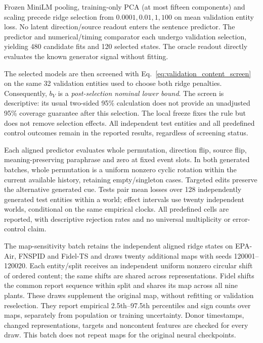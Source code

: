 Frozen MiniLM pooling, training-only PCA (at most fifteen components) and scaling precede ridge selection from $0.0001,0.01,1,100$ on mean validation entity loss. No latent direction/source readout enters the sentence predictor. The predictor and numerical/timing comparator each undergo validation selection, yielding 480 candidate fits and 120 selected states. The oracle readout directly evaluates the known generator signal without fitting.

The selected models are then screened with Eq.~\ref{eq:validation_content_screen} on the same 32 validation entities used to choose both ridge penalties. Consequently, $b_V$ is a \emph{post-selection nominal lower bound}. The screen is descriptive: its usual two-sided 95\% calculation does not provide an unadjusted 95\% coverage guarantee after this selection. The local freeze fixes the rule but does not remove selection effects. All independent test entities and all predefined control outcomes remain in the reported results, regardless of screening status.

Each aligned predictor evaluates whole permutation, direction flip, source flip, meaning-preserving paraphrase and zero at fixed event slots. In both generated batches, whole permutation is a uniform nonzero cyclic rotation within the current available history, retaining empty/singleton cases. Targeted edits preserve the alternative generated cue. Tests pair mean losses over 128 independently generated test entities within a world; effect intervals use twenty independent worlds, conditional on the same empirical clocks. All predefined cells are reported, with descriptive rejection rates and no universal multiplicity or error-control claim.

The map-sensitivity batch retains the independent aligned ridge states on EPA-Air, FNSPID and Fidel-TS and draws twenty additional maps with seeds 120001--120020. Each entity/split receives an independent uniform nonzero circular shift of ordered content; the same shifts are shared across representations. Fidel shifts the common report sequence within split and shares its map across all nine plants. These draws supplement the original map, without refitting or validation reselection. They report empirical 2.5th--97.5th percentiles and sign counts over maps, separately from population or training uncertainty. Donor timestamps, changed representations, targets and noncontent features are checked for every draw. This batch does not repeat maps for the original neural checkpoints.
